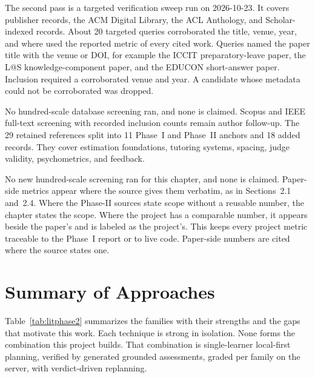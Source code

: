 The second pass is a targeted verification sweep run on 2026-10-23. It covers publisher records, the ACM Digital Library, the ACL Anthology, and Scholar-indexed records. About 20 targeted queries corroborated the title, venue, year, and where used the reported metric of every cited work. Queries named the paper title with the venue or DOI, for example the ICCIT preparatory-leave paper, the L@S knowledge-component paper, and the EDUCON short-answer paper. Inclusion required a corroborated venue and year. A candidate whose metadata could not be corroborated was dropped.

No hundred-scale database screening ran, and none is claimed. Scopus and IEEE full-text screening with recorded inclusion counts remain author follow-up. The 29 retained references split into 11 Phase~I and Phase~II anchors and 18 added records. They cover estimation foundations, tutoring systems, spacing, judge validity, psychometrics, and feedback.

No new hundred-scale screening ran for this chapter, and none is claimed. Paper-side metrics appear where the source gives them verbatim, as in Sections~2.1 and~2.4. Where the Phase-II sources state scope without a reusable number, the chapter states the scope. Where the project has a comparable number, it appears beside the paper's and is labeled as the project's. This keeps every project metric traceable to the Phase~I report or to live code. Paper-side numbers are cited where the source states one.

\section{Summary of Approaches}
Table~\ref{tab:litphase2} summarizes the families with their strengths and the gaps that motivate this work. Each technique is strong in isolation. None forms the combination this project builds. That combination is single-learner local-first planning, verified by generated grounded assessments, graded per family on the server, with verdict-driven replanning.

